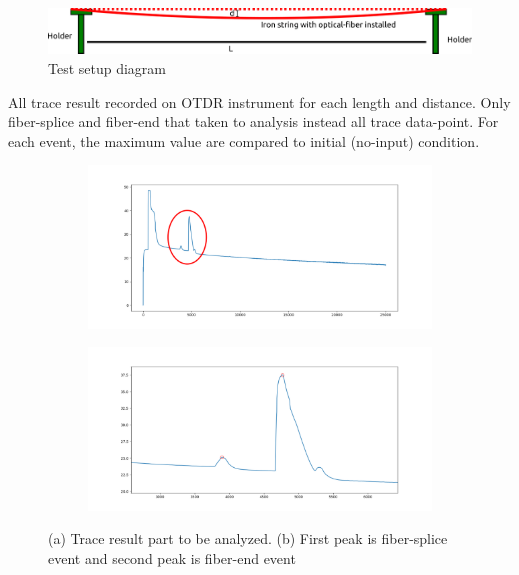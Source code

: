 \documentclass[a4paper,14pt]{article}
\begin{document}
\begin{figure}[h!]
	\centering
	\captionsetup{justification=centering}
	\includegraphics[width=0.6\linewidth]{images/setup}
	\caption[Setup Diagram]{\small{Test setup diagram}}
\end{figure}

All trace result recorded on OTDR instrument for each length and distance.
Only fiber-splice and fiber-end that taken to analysis instead all trace data-point.
For each event, the maximum value are compared to initial (no-input) condition.

\begin{figure}[h!]
	\centering
	\captionsetup{justification=centering}
	\begin{subfigure}[b]{0.49\textwidth}
		\includegraphics[width=\textwidth]{images/base}
		\caption{}
	\end{subfigure}
	\begin{subfigure}[b]{0.49\textwidth}
		\includegraphics[width=\textwidth]{images/take_point}
		\caption{}
	\end{subfigure}
	\caption[Setup Diagram]{\small{(a) Trace result part to be analyzed. (b) First peak is fiber-splice event and second peak is fiber-end event}}
\end{figure}
\end{document}

